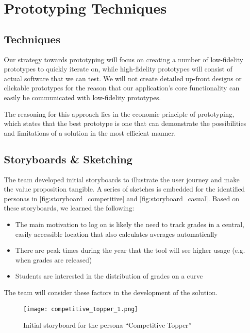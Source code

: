 \section{Prototyping Techniques}
\subsection{Techniques}
Our strategy towards prototyping will focus on creating a number of low-fidelity prototypes to quickly iterate on, while high-fidelity prototypes will consist of actual software that we can test. We will not create detailed up-front designs or clickable prototypes for the reason that our application's core functionality can easily be communicated with low-fidelity prototypes.

The reasoning for this approach lies in the economic principle of prototyping, which states that the best prototype is one that can demonstrate the possibilities and limitations of a solution in the most efficient manner.

\subsection{Storyboards \& Sketching}
The team developed initial storyboards to illustrate the user journey and make the value proposition tangible. A series of sketches is embedded for the identified personas in \autoref{fig:storyboard_competitive} and \autoref{fig:storyboard_casual}. Based on these storyboards, we learned the following:
\begin{itemize}
    \item The main motivation to log on is likely the need to track grades in a central, easily accessible location that also calculates averages automatically
    \item There are peak times during the year that the tool will see higher usage (e.g. when grades are released)
    \item Students are interested in the distribution of grades on a curve
\end{itemize}

The team will consider these factors in the development of the solution.

\begin{figure}[H]
    \centering
    \texttt{[image: competitive\_topper\_1.png]}
    \caption{Initial storyboard for the persona ``Competitive Topper''}
    \label{fig:storyboard_competitive}
\end{figure}

